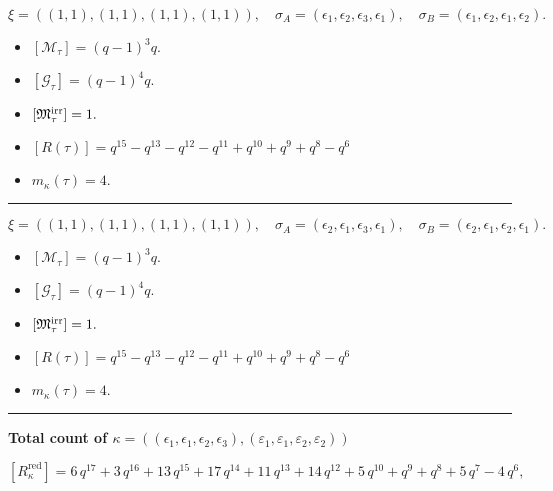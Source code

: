 \documentclass[10pt,a4paper]{amsart}
\begin{document}
$$\xi = ({(1, 1)}, {(1, 1)}, {(1, 1)}, {(1, 1)}),\quad \sigma_A = ({{\epsilon_1}}, {{\epsilon_2}}, {{\epsilon_3}}, {{\epsilon_1}}),\quad \sigma_B = ({{\epsilon_1}}, {{\epsilon_2}}, {{\epsilon_1}}, {{\epsilon_2}}).$$

\begin{itemize}
 \item $[\mathcal{M}_{\tau}] = {\left(q - 1\right)}^{3} q .$

 \item $[\mathcal{G}_{\tau}] = {\left(q - 1\right)}^{4} q .$

 \item $[{\frak M}_{\tau}^{\textrm{irr}}] = 1 .$

 \item $[R(\tau)] = q^{15} - q^{13} - q^{12} - q^{11} + q^{10} + q^{9} + q^{8} - q^{6} $

 \item $m_{\kappa}(\tau) = 4 .$

 \end{itemize}
\noindent\rule{8cm}{0.4pt}

$$\xi = ({(1, 1)}, {(1, 1)}, {(1, 1)}, {(1, 1)}),\quad \sigma_A = ({{\epsilon_2}}, {{\epsilon_1}}, {{\epsilon_3}}, {{\epsilon_1}}),\quad \sigma_B = ({{\epsilon_2}}, {{\epsilon_1}}, {{\epsilon_2}}, {{\epsilon_1}}).$$

\begin{itemize}
 \item $[\mathcal{M}_{\tau}] = {\left(q - 1\right)}^{3} q .$

 \item $[\mathcal{G}_{\tau}] = {\left(q - 1\right)}^{4} q .$

 \item $[{\frak M}_{\tau}^{\textrm{irr}}] = 1 .$

 \item $[R(\tau)] = q^{15} - q^{13} - q^{12} - q^{11} + q^{10} + q^{9} + q^{8} - q^{6} $

 \item $m_{\kappa}(\tau) = 4 .$

 \end{itemize}
\noindent\rule{9cm}{2pt}\vspace{0.2cm}

\noindent\textbf{Total count of $\kappa = ((\epsilon_1,\epsilon_1,\epsilon_2,\epsilon_3), (\varepsilon_1,\varepsilon_1,\varepsilon_2,\varepsilon_2))$}\medskip

${[R_{\kappa}^{\textrm{red}}]} = 6 \, q^{17} + 3 \, q^{16} + 13 \, q^{15} + 17 \, q^{14} + 11 \, q^{13} + 14 \, q^{12} + 5 \, q^{10} + q^{9} + q^{8} + 5 \, q^{7} - 4 \, q^{6} ,$
\end{document}
